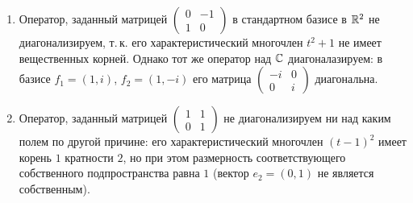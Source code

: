 \begin{example}
    \begin{enumerate}[nolistsep]
        \item Оператор, заданный матрицей
            $
            \begin{pmatrix}
                0 & -1\\
                1 & 0
            \end{pmatrix}
            $ в стандартном базисе в $\mathbb{R}^2$ не диагонализируем, т.\,к. его характеристический многочлен $t^2 + 1$ не имеет вещественных корней. Однако тот же оператор над $\mathbb{C}$ диагоналазируем: в базисе $f_1 = (1, i)$, $f_2 = (1, -i)$ его матрица
            $
            \begin{pmatrix}
                -i & 0\\
                0 & i
            \end{pmatrix}
            $ диагональна.
        \item Оператор, заданный матрицей
            $
            \begin{pmatrix}
                1 & 1\\
                0 & 1
            \end{pmatrix}
            $ не диагонализируем ни над каким полем по другой причине: его характеристический многочлен $(t - 1)^2$ имеет корень $1$ кратности $2$, но при этом размерность соответствующего собственного подпространства равна $1$ (вектор $e_2 = (0, 1)$ не является собственным).
    \end{enumerate}
\end{example}

